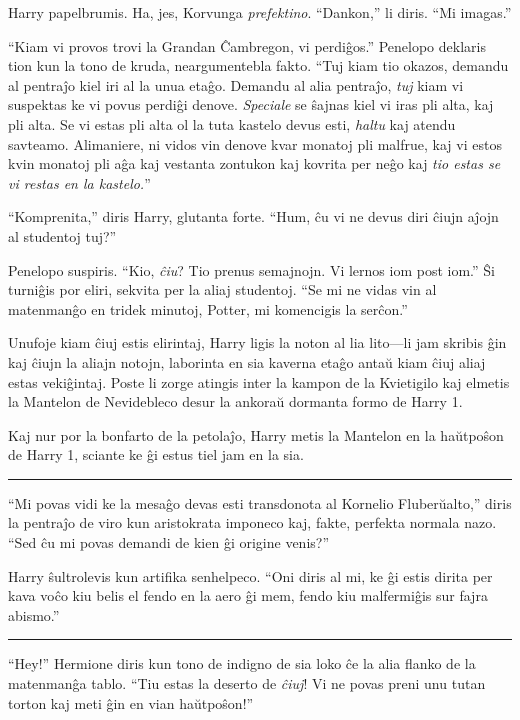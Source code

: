 Harry papelbrumis. Ha, jes, Korvunga \emph{prefektino}. ``Dankon,'' li
diris. ``Mi imagas.''

``Kiam vi provos trovi la Grandan Ĉambregon, vi perdiĝos.'' Penelopo
deklaris tion kun la tono de kruda, neargumentebla fakto. ``Tuj kiam
tio okazos, demandu al pentraĵo kiel iri al la unua etaĝo. Demandu al
alia pentraĵo, \emph{tuj} kiam vi suspektas ke vi povus perdiĝi
denove. \emph{Speciale} se ŝajnas kiel vi iras pli alta, kaj pli
alta. Se vi estas pli alta ol la tuta kastelo devus esti, \emph{haltu}
kaj atendu savteamo. Alimaniere, ni vidos vin denove kvar monatoj pli
malfrue, kaj vi estos kvin monatoj pli aĝa kaj vestanta zontukon kaj
kovrita per neĝo kaj \emph{tio estas se vi restas en la kastelo.}''

``Komprenita,'' diris Harry, glutanta forte. ``Hum, ĉu vi ne devus
diri ĉiujn aĵojn al studentoj tuj?''

Penelopo suspiris. ``Kio, \emph{ĉiu}? Tio prenus semajnojn. Vi lernos
iom post iom.''  Ŝi turniĝis por eliri, sekvita per la aliaj
studentoj. ``Se mi ne vidas vin al matenmanĝo en tridek minutoj,
Potter, mi komencigis la serĉon.''

Unufoje kiam ĉiuj estis elirintaj, Harry ligis la noton al lia lito—li
jam skribis ĝin kaj ĉiujn la aliajn notojn, laborinta en sia kaverna
etaĝo antaŭ kiam ĉiuj aliaj estas vekiĝintaj. Poste li zorge atingis
inter la kampon de la Kvietigilo kaj elmetis la Mantelon de
Nevidebleco desur la ankoraŭ dormanta formo de Harry 1.

Kaj nur por la bonfarto de la petolaĵo, Harry metis la Mantelon en la
haŭtpoŝon de Harry 1, sciante ke ĝi estus tiel jam en la sia.

\begin{center}\rule{3in}{0.4pt}\end{center}

``Mi povas vidi ke la mesaĝo devas esti transdonota al Kornelio
Fluberŭalto,'' diris la pentraĵo de viro kun aristokrata imponeco kaj,
fakte, perfekta normala nazo. ``Sed ĉu mi povas demandi de kien ĝi
origine venis?''

Harry ŝultrolevis kun artifika senhelpeco. ``Oni diris al mi, ke ĝi
estis dirita per kava voĉo kiu belis el fendo en la aero ĝi mem, fendo
kiu malfermiĝis sur fajra abismo.''

\begin{center}\rule{3in}{0.4pt}\end{center}

``Hey!'' Hermione diris kun tono de indigno de sia loko ĉe la alia
flanko de la matenmanĝa tablo. ``Tiu estas la deserto de \emph{ĉiuj}!
Vi ne povas preni unu tutan torton kaj meti ĝin en vian haŭtpoŝon!''

